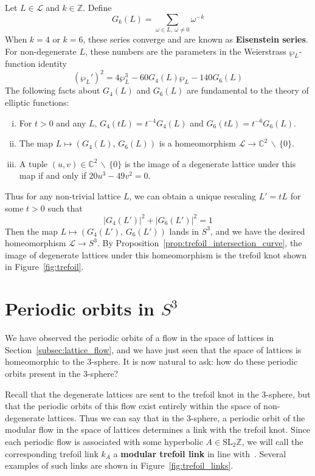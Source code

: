 \documentclass[12pt,twoside]{reedthesis}
\theoremstyle{definition}
\newcommand{\Z}{\mathbb{Z}}
\newcommand{\C}{\mathbb{C}}
\newcommand{\LS}{\mathcal{L}}
\newcommand{\SLZ}{\mathrm{SL}_2{\Z}}
\newcommand{\wo}{\, \backslash \,}
\newcommand{\defnphrase}[1]{\textbf{#1}}
\begin{document}
Let $L \in \LS$ and $k \in \Z$.
Define
\begin{equation*}
  G_k(L) = \sum_{\omega \in L,\ \omega \neq 0} \omega^{-k}
\end{equation*}
When $k = 4$ or $k = 6$, these series converge and are known as \defnphrase{Eisenstein series}.
For non-degenerate $L$, these numbers are the parameters in the Weierstrass $\wp_L$-function identity
\begin{equation*}
  (\wp_L')^2 = 4 \wp_L^3 - 60 G_4(L) \wp_L - 140 G_6(L)
\end{equation*}
The following facts about $G_4(L)$ and $G_6(L)$ are fundamental to the theory of elliptic functions:
\begin{enumerate}[(i)]
  \item For $t > 0$ and any $L$, $G_4(tL) = t^{-4} G_4(L)$ and $G_6(tL) = t^{-6} G_6(L)$.
  
  \item The map $L \mapsto (G_4(L),\, G_6(L))$ is a homeomorphism $\LS \to \C^2 \wo \{ 0 \}$.

  \item A tuple $(u, v) \in \C^2 \wo \{ 0 \}$ is the image of a degenerate lattice under this map if and only if $20u^3 - 49v^2 = 0$.
\end{enumerate}
Thus for any non-trivial lattice $L$, we can obtain a unique rescaling $L' = tL$ for some $t > 0$ such that
\begin{equation*}
  |G_4(L')|^2 + |G_6(L')|^2 = 1
\end{equation*}
Then the map $L \mapsto (G_4(L'),\, G_6(L'))$ lands in $S^3$, and we have the desired homeomorphism $\LS \to S^3$.
By Proposition~\ref{prop:trefoil_intersection_curve}, the image of degenerate lattices under this homeomorphism is the trefoil knot shown in Figure~\ref{fig:trefoil}.

\section{Periodic orbits in $S^3$}\label{sec:periodic_orbits_in_s3}

We have observed the periodic orbits of a flow in the space of lattices in Section~\ref{subsec:lattice_flow}, and we have just seen that the space of lattices is homeomorphic to the 3-sphere.
It is now natural to ask: how do these periodic orbits present in the 3-sphere?

Recall that the degenerate lattices are sent to the trefoil knot in the 3-sphere, but that the periodic orbits of this flow exist entirely within the space of non-degenerate lattices.
Thus we can say that in the 3-sphere, a periodic orbit of the modular flow in the space of lattices determines a link with the trefoil knot.
Since each periodic flow is associated with some hyperbolic $A \in \SLZ$, we will call the corresponding trefoil link $k_A$ a \defnphrase{modular trefoil link} in line with~\cite{ghys2007}.
Several examples of such links are shown in Figure~\ref{fig:trefoil_links}.
\end{document}
